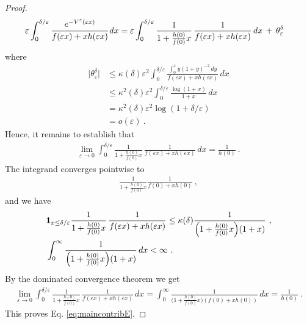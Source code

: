 \documentclass[reqno, 12pt, a4paper]{amsart}
\theoremstyle{plain}
\theoremstyle{definition}
\begin{document}
\begin{proof}
\begin{equation}
\begin{split}
\varepsilon \int_0^{\delta/\varepsilon} \cfrac{e^{- V^\varepsilon (\varepsilon x) }}{f(\varepsilon x) +x h(\varepsilon x)} \, dx  & = \varepsilon \int_0^{\delta/\varepsilon} \frac{1}{1+ \tfrac{h(0)}{f(0)} x } \, \frac{1}{f(\varepsilon x) + x h( \varepsilon x)}\, dx \, + \, \theta_{\varepsilon}^\delta 
\end{split}
\end{equation}
where 
\begin{equation}
\begin{split}
\vert \theta_\varepsilon^\delta \vert & \le \kappa (\delta) \varepsilon^2 \int_0^{\delta/\varepsilon} \frac{ \int_0^x y (1+y)^{-2}\, dy}{f(\varepsilon x) + x h(\varepsilon x)} \, dx \\
& \le  \kappa^2 (\delta) \varepsilon^2 \int_0^{\delta/\varepsilon} \frac{ \log(1+x)}{1 + x } \, dx  \\
&= \kappa^2 (\delta) \varepsilon^2 \log (1+ \delta/\varepsilon) \\
& = o(\varepsilon) \ .
\end{split}
\end{equation}
Hence, it remains to establish that 
\begin{equation}
\begin{split}
\lim_{\varepsilon \to 0} \int_0^{\delta/\varepsilon} \frac{1}{1+ \tfrac{h(0)}{f(0)} x } \, \frac{1}{f(\varepsilon x) + x h( \varepsilon x)}\, dx = \frac{1}{h(0)} \ .
\end{split}
\end{equation}
The integrand converges pointwise to 
\begin{equation}
\begin{split}
\frac{1}{1+ \tfrac{h(0)}{f(0)} x } \frac{1}{f(0) + x h(0)}  \ ,
\end{split}
\end{equation}
and we have 
\begin{equation}
\begin{split}
& {\bf 1}_{x \le \delta/\varepsilon}  \frac{1}{1+ \tfrac{h(0)}{f(0)} x } \, \frac{1}{f(\varepsilon x) + x h( \varepsilon x)} \le \kappa(\delta) \frac{1}{\Big(1+ \tfrac{h(0)}{f(0)} x\Big) (1+x) } \ , \\
& \int_{0}^{\infty} \frac{1}{\Big(1+ \tfrac{h(0)}{f(0)} x\Big) (1+x) } \,  dx < \infty \ .
\end{split}
\end{equation}
By the dominated convergence theorem we get 
\begin{equation}
\begin{split}
\lim_{\varepsilon \to 0} \int_0^{\delta/\varepsilon} \frac{1}{1+ \tfrac{h(0)}{f(0)} x } \, \frac{1}{f(\varepsilon x) + x h( \varepsilon x)}\, dx =   \int_0^ \infty \frac{1}{\Big(1+ \tfrac{h(0)}{f(0)} x\Big) (f(0)+x h(0)) } \, dx = \frac{1}{h(0)} \ .
\end{split}
\end{equation}
This proves Eq. \eqref{eq:maincontribE}.



\end{proof}
\end{document}
